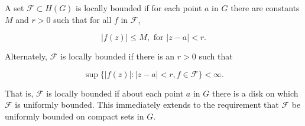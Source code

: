 A set $\mathcal{F} \subset H(G)$ is locally bounded if for each point $a$ in $G$ there are constants $M$ and $r > 0$ such that for all $f$ in $\mathcal{F}$,

$$|f(z)| \leq M, \text{ for } |z-a| < r.$$

Alternately, $\mathcal{F}$ is locally bounded if there is an $r > 0$ such that

$$\sup \{|f(z)|: |z-a| < r, f \in \mathcal{F}\} < \infty.$$

That is, $\mathcal{F}$ is locally bounded if about each point $a$ in $G$ there is a disk on which $\mathcal{F}$ is uniformly bounded. This immediately extends to the requirement that $\mathcal{F}$ be uniformly bounded on compact sets in $G$.